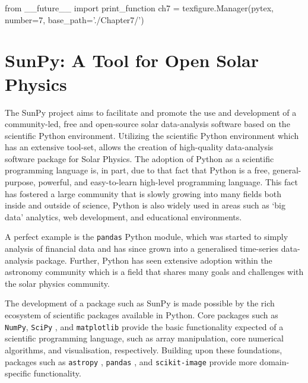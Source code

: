 \begin{pycode}[chapter7]
from __future__ import print_function
ch7 = texfigure.Manager(pytex, number=7, base_path='./Chapter7/')

\end{pycode}

\chapter[]{SunPy: A Tool for Open Solar Physics}\label{ch:sunpy}

The SunPy project \citep{thesunpycommunity2015a} aims to facilitate and promote the use and development of a community-led, free and open-source solar data-analysis software based on the scientific Python environment.
Utilizing the scientific Python environment which has an extensive tool-set, allows the creation of high-quality data-analysis software package for Solar Physics.
The adoption of Python as a scientific programming language is, in part, due to that fact that Python is a free, general-purpose, powerful, and easy-to-learn high-level programming language.
This fact has fostered a large community that is slowly growing into many fields both inside and outside of science, Python is also widely used in areas such as `big data' analytics, web development, and educational environments.

A perfect example is the \texttt{pandas} \citep{mckinney2010, mckinney2012} Python module, which was started to simply analysis of financial data and has since grown into a generalised time-series data-analysis package.
Further, Python has seen extensive adoption within the astronomy community \citep{greenfield2011} which is a field that shares many goals and challenges with the solar physics community.

The development of a package such as SunPy is made possible by the rich ecosystem of scientific packages available in Python.
Core packages such as \texttt{NumPy}, 
\texttt{SciPy} \citep{jones2001}, and \texttt{matplotlib} \citep{hunter2007} provide the basic functionality expected of a scientific programming language, such as array manipulation, core numerical algorithms, and visualisation, respectively.
Building upon these foundations, packages such as \texttt{astropy} \citep[astronomy;][]{theastropycollaboration2013}, \texttt{pandas} \citep[time-series;][]{mckinney2012}, and \texttt{scikit-image} \citep[image processing;][]{vanderwalt2014} provide more domain-specific functionality.

